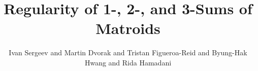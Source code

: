 
\title{Regularity of 1-, 2-, and 3-Sums of Matroids}
\author{Ivan Sergeev and Martin Dvorak and Tristan Figueroa-Reid and Byung-Hak Hwang and Rida Hamadani}

\usepackage{amsmath} %
\usepackage{amssymb} %
\usepackage{amsthm} %
\usepackage[unicode,colorlinks=true,linkcolor=blue,urlcolor=magenta,citecolor=blue]{hyperref}  %
\usepackage{tikz}  %

\newtheorem{theorem}{Theorem}
\theoremstyle{definition}
\newtheorem{lemma}[theorem]{Lemma}
\newtheorem{definition}[theorem]{Definition}

\newcommand{\SeeLean}{See implementation in Lean.}
